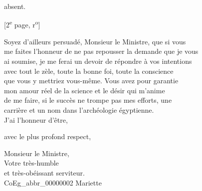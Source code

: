 \documentclass{book}
\begin{document}
absent.
{\footnotesize \begin{center} {[2\textsuperscript{e} page, r\textsuperscript{o}]}\end{center}}
\indent Soyez d’ailleurs persuadé, Monsieur le Ministre, que si vous\\
me faites l’honneur de ne pas repousser la demande que je vous\\
ai soumise, je me ferai un devoir de répondre à vos intentions\\
avec tout le zèle, toute la bonne foi, toute la conscience\\
que vous y mettriez vous-même. Vous avez pour garantie\\
mon amour réel de la science et le désir qui m’anime\\
de me faire, si le succès ne trompe pas mes efforts, une\\
carrière et un nom dans l’archéologie égyptienne.\\
\indent J’ai l’honneur d’être,
\begin{center}avec le plus profond respect,\end{center}
\begin{center}\hspace{5cm}Monsieur le Ministre,\\
\hspace{5cm}Votre très-humble\\
\hspace{5cm}et très-obéissant serviteur.\\
\hspace{5cm}\gls{CoEg_abbr_00000002} Mariette\end{center}

\hypertarget{CoEg_Mariette_1850-07-08}{}
\end{document}
